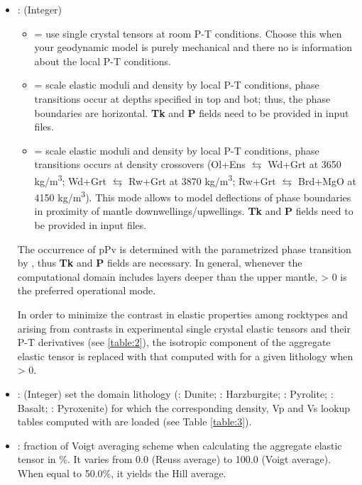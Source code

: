 \begin{itemize}
    \item {}: (Integer)
    \begin{itemize}
        \item[]  = use single crystal tensors at room P-T conditions. Choose this when your geodynamic model is purely mechanical and there no is information about the local P-T conditions.
        \item[]  = scale elastic moduli and density by local P-T conditions, phase transitions occur at depths specified in top and bot; thus, the phase boundaries are horizontal. \textbf{Tk} and \textbf{P} fields need to be provided in input \vtptitle{} files.
        \item[]  = scale elastic moduli and density by local P-T conditions, phase transitions occurs at density crossovers (Ol+Ens $\leftrightarrows$ Wd+Grt at  3650 \si{kg/m^3}; Wd+Grt $\leftrightarrows$ Rw+Grt at  3870 \si{kg/m^3}; Rw+Grt $\leftrightarrows$ Brd+MgO at  4150 \si{kg/m^3}). This mode allows to model deflections of phase boundaries in proximity of mantle downwellings/upwellings. \textbf{Tk} and \textbf{P} fields need to be provided in input \vtptitle{} files.
    \end{itemize}
    
    The occurrence of pPv is determined with the parametrized phase transition by \citet{oganov2004nature}, thus \textbf{Tk} and \textbf{P} fields are necessary. In general, whenever the computational domain includes layers deeper than the upper mantle,  > 0 is the preferred operational mode.
    
    In order to minimize the contrast in elastic properties among rocktypes and arising from contrasts in experimental single crystal elastic tensors and their P-T derivatives (see \ref{table:2}), the isotropic component of the aggregate elastic tensor is replaced with that computed with \mmaeostitle{} for a given lithology when  > 0.
    
    \item {}: (Integer) set the domain lithology (: Dunite; : Harzburgite; : Pyrolite; : Basalt; : Pyroxenite) for which the corresponding density, Vp and Vs lookup tables computed with \mmaeostitle{} are loaded (see Table \ref{table:3}).
    
    \item {}: fraction of Voigt averaging scheme when calculating the aggregate elastic tensor in \%. It varies from 0.0 (Reuss average) to 100.0 (Voigt average). When equal to 50.0\%, it yields the Hill average.
    
\end{itemize}

